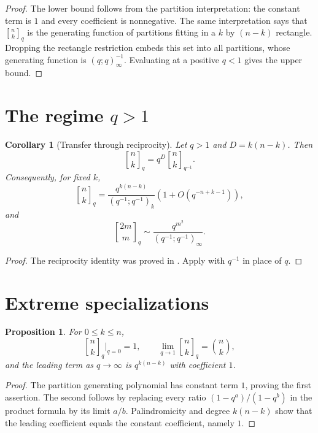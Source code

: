 \documentclass[11pt,oneside,openany]{book}
\newtheorem{proposition}[theorem]{Proposition}
\newtheorem{corollary}[theorem]{Corollary}
\theoremstyle{definition}
\theoremstyle{remark}
\newcommand{\qbinom}[2]{\genfrac{[}{]}{0pt}{}{#1}{#2}_{q}}
\newcommand{\Qbinom}[3]{\genfrac{[}{]}{0pt}{}{#1}{#2}_{#3}}
\begin{document}
\begin{proof}
The lower bound follows from the partition interpretation: the constant term is $1$ and every coefficient is nonnegative.  The same interpretation says that $\qbinom nk$ is the generating function of partitions fitting in a $k$ by $(n-k)$ rectangle.  Dropping the rectangle restriction embeds this set into all partitions, whose generating function is $(q;q)_\infty^{-1}$.  Evaluating at a positive $q<1$ gives the upper bound.
\end{proof}

\section{The regime \texorpdfstring{$q>1$}{q greater than 1}}

\begin{corollary}[Transfer through reciprocity]\label{cor:qgreaterone}
Let $q>1$ and $D=k(n-k)$.  Then
\[
 \qbinom nk=q^D\Qbinom nk{q^{-1}}.
 \tag{19.9}\label{eq:qgreaterone-reciprocity}
\]
Consequently, for fixed $k$,
\[
 \qbinom nk
 =\frac{q^{k(n-k)}}{(q^{-1};q^{-1})_k}
 \left(1+O(q^{-n+k-1})\right),
 \tag{19.10}\label{eq:qgreaterone-fixed-k}
\]
and
\[
 \qbinom{2m}{m}
 \sim\frac{q^{m^2}}{(q^{-1};q^{-1})_\infty}.
 \tag{19.11}\label{eq:qgreaterone-central}
\]
\end{corollary}

\begin{proof}
The reciprocity identity was proved in .  Apply  with $q^{-1}$ in place of $q$.
\end{proof}

\section{Extreme specializations}

\begin{proposition}\label{prop:extreme-specializations}
For $0\le k\le n$,
\[
 \qbinom nk\bigg|_{q=0}=1,
 \qquad
 \lim_{q\to1}\qbinom nk=\binom nk,
\]
and the leading term as $q\to\infty$ is $q^{k(n-k)}$ with coefficient $1$.
\end{proposition}

\begin{proof}
The partition generating polynomial has constant term $1$, proving the first assertion.  The second follows by replacing every ratio $(1-q^a)/(1-q^b)$ in the product formula by its limit $a/b$.  Palindromicity and degree $k(n-k)$ show that the leading coefficient equals the constant coefficient, namely $1$.
\end{proof}
\end{document}
